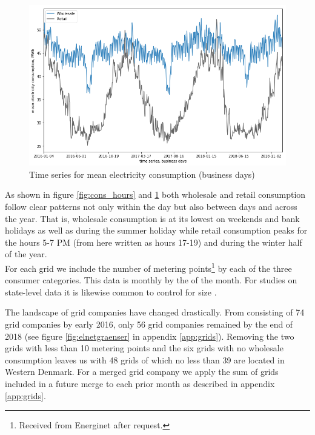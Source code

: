 \begin{figure}[H]
  \centering
  \caption{Time series for mean electricity consumption (business days)}
  \label{fig:cons_time_series}
  \includegraphics[width=1 \textwidth]{03_figures/cons_time series, business days}
\end{figure}
\noindent
As shown in figure \ref{fig:cons_hours} and \ref{fig:cons_time_series} both wholesale and retail consumption follow clear patterns not only within the day but also between days and across the year. That is, wholesale consumption is at its lowest on weekends and bank holidays as well as during the summer holiday while retail consumption peaks for the hours 5-7 PM (from here written as hours 17-19) and during the winter half of the year.
\medskip\\
For each grid we include the number of metering points\footnote{Received from Energinet after request.} by each of the three consumer categories. This data is monthly by the  of the month. For studies on state-level data it is likewise common to control for size \citep{burke2017price}.
\par
The landscape of grid companies have changed drastically. From consisting of 74 grid companies by early 2016, only 56 grid companies remained by the end of 2018 (see figure \ref{fig:elnetgraenser} in appendix \ref{app:grids}). Removing the two grids with less than 10 metering points and the six grids with no wholesale consumption leaves us with 48 grids of which no less than 39 are located in Western Denmark. For a merged grid company we apply the sum of grids included in a future merge to each prior month as described in appendix \ref{app:grids}.


